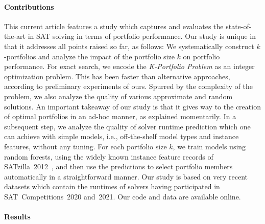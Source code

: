 \documentclass[conference]{IEEEtran}
\begin{document}
\paragraph{Contributions}

This current article features a study which captures and evaluates the state-of-the-art in SAT solving in terms of portfolio performance. 
Our study is unique in that it addresses all points raised so far, as follows:
We systematically construct $k$-portfolios and analyze the impact of the portfolio size $k$ on portfolio performance. 
For exact search, we encode the \emph{K-Portfolio Problem} as an integer optimization problem. 
This has been faster than alternative approaches, according to preliminary experiments of ours. 
Spurred by the complexity of the problem, we also analyze the quality of various approximate and random solutions. 
An important takeaway of our study is that it gives way to the creation of optimal portfolios in an ad-hoc manner, as explained momentarily. 
In a subsequent step, we analyze the quality of solver runtime prediction which one can achieve with simple models, i.e., off-the-shelf model types and instance features, without any tuning.
For each portfolio size $k$, we train models using random forests, using the widely known instance feature records of SATzilla~2012~\cite{xu2012satzilla2012}, and then use the predictions to select portfolio members automatically in a straightforward manner. 
Our study is based on very recent datasets which contain the runtimes of solvers having participated in SAT~Competitions~2020 and~2021. 
Our code and data are available online.

\paragraph{Results}
\end{document}
